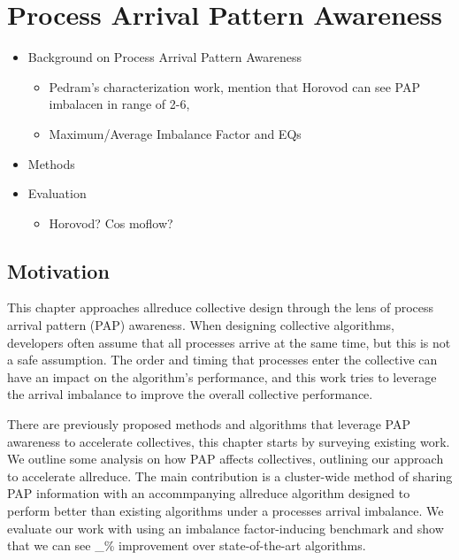 
\glsresetall %
\chapter[PAPAwareness]{Process Arrival Pattern Awareness}\label{ch:PAPAwareness}

\begin{itemize}
    \item Background on Process Arrival Pattern Awareness
    \begin{itemize}
        \item Pedram's characterization work, mention that Horovod can see PAP imbalacen in range of 2-6, \cite{Alizadeh2022PAPCollDL, Mohammadalizadehbakhtevari2021Thesis}
        \item Maximum/Average Imbalance Factor and EQs
    \end{itemize}
    \item Methods
    \item Evaluation
    \begin{itemize}
        \item Horovod? Cos  moflow?
    \end{itemize}
\end{itemize}

\section{Motivation}

This chapter approaches allreduce collective design through the lens of process arrival pattern (PAP) awareness. 
When designing collective algorithms, developers often assume that all processes arrive at the same time, but this is not a safe assumption.
The order and timing that processes enter the collective can have an impact on the algorithm's performance, and this work tries to leverage the arrival imbalance to improve the overall collective performance.

There are previously proposed methods and algorithms that leverage PAP awareness to accelerate collectives, this chapter starts by surveying existing work.
We outline some analysis on how PAP affects collectives, outlining our approach to accelerate allreduce.
The main contribution is a cluster-wide method of sharing PAP information with an accommpanying allreduce algorithm designed to perform better than existing algorithms under a processes arrival imbalance.
We evaluate our work with using an imbalance factor-inducing benchmark and show that we can see \_\% improvement over state-of-the-art algorithms.  

